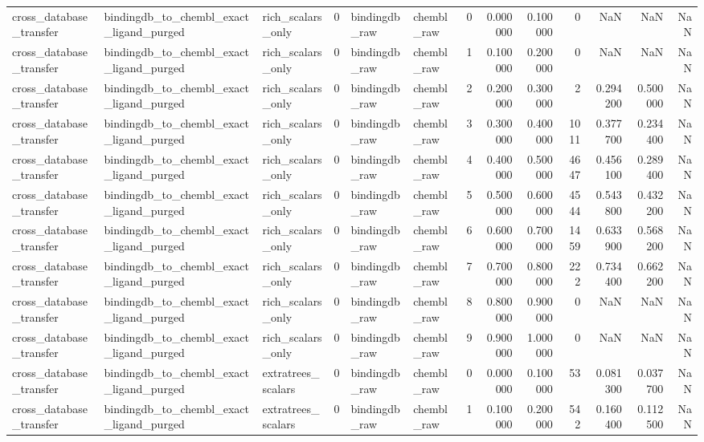 \begin{longtable}{lllrllrrrrrrr}
cross\_database\_transfer & bindingdb\_to\_chembl\_exact\_ligand\_purged & rich\_scalars\_only & 0 & bindingdb\_raw & chembl\_raw & 0 & 0.000000 & 0.100000 & 0 & NaN & NaN & NaN \\
cross\_database\_transfer & bindingdb\_to\_chembl\_exact\_ligand\_purged & rich\_scalars\_only & 0 & bindingdb\_raw & chembl\_raw & 1 & 0.100000 & 0.200000 & 0 & NaN & NaN & NaN \\
cross\_database\_transfer & bindingdb\_to\_chembl\_exact\_ligand\_purged & rich\_scalars\_only & 0 & bindingdb\_raw & chembl\_raw & 2 & 0.200000 & 0.300000 & 2 & 0.294200 & 0.500000 & NaN \\
cross\_database\_transfer & bindingdb\_to\_chembl\_exact\_ligand\_purged & rich\_scalars\_only & 0 & bindingdb\_raw & chembl\_raw & 3 & 0.300000 & 0.400000 & 1011 & 0.377700 & 0.234400 & NaN \\
cross\_database\_transfer & bindingdb\_to\_chembl\_exact\_ligand\_purged & rich\_scalars\_only & 0 & bindingdb\_raw & chembl\_raw & 4 & 0.400000 & 0.500000 & 4647 & 0.456100 & 0.289400 & NaN \\
cross\_database\_transfer & bindingdb\_to\_chembl\_exact\_ligand\_purged & rich\_scalars\_only & 0 & bindingdb\_raw & chembl\_raw & 5 & 0.500000 & 0.600000 & 4544 & 0.543800 & 0.432200 & NaN \\
cross\_database\_transfer & bindingdb\_to\_chembl\_exact\_ligand\_purged & rich\_scalars\_only & 0 & bindingdb\_raw & chembl\_raw & 6 & 0.600000 & 0.700000 & 1459 & 0.633900 & 0.568200 & NaN \\
cross\_database\_transfer & bindingdb\_to\_chembl\_exact\_ligand\_purged & rich\_scalars\_only & 0 & bindingdb\_raw & chembl\_raw & 7 & 0.700000 & 0.800000 & 222 & 0.734400 & 0.662200 & NaN \\
cross\_database\_transfer & bindingdb\_to\_chembl\_exact\_ligand\_purged & rich\_scalars\_only & 0 & bindingdb\_raw & chembl\_raw & 8 & 0.800000 & 0.900000 & 0 & NaN & NaN & NaN \\
cross\_database\_transfer & bindingdb\_to\_chembl\_exact\_ligand\_purged & rich\_scalars\_only & 0 & bindingdb\_raw & chembl\_raw & 9 & 0.900000 & 1.000000 & 0 & NaN & NaN & NaN \\
cross\_database\_transfer & bindingdb\_to\_chembl\_exact\_ligand\_purged & extratrees\_scalars & 0 & bindingdb\_raw & chembl\_raw & 0 & 0.000000 & 0.100000 & 53 & 0.081300 & 0.037700 & NaN \\
cross\_database\_transfer & bindingdb\_to\_chembl\_exact\_ligand\_purged & extratrees\_scalars & 0 & bindingdb\_raw & chembl\_raw & 1 & 0.100000 & 0.200000 & 542 & 0.160400 & 0.112500 & NaN \\

\end{longtable}
